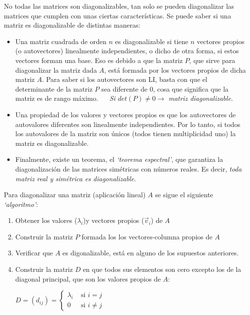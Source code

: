 No todas las matrices son diagonalizables, tan solo se pueden diagonalizar las matrices que cumplen con unas ciertas características. Se puede saber si una matriz es diagonalizable de distintas maneras:

\begin{itemize}

\item Una matriz cuadrada de orden $n$ es diagonalizable si tiene $n$ vectores propios (o autovectores) linealmente independientes, o dicho de otra forma, si estos vectores forman una base. Eso es debido a que la matriz $P$, que sirve para diagonalizar la matriz dada $A$, está formada por los vectores propios de dicha matriz $A$. Para saber si los autovectores son LI, basta con que el determinante de la matriz $P$ sea diferente de $0$, cosa que significa que la matriz es de rango máximo. $\quad$ \emph{Si $det(P)\neq 0 \to $ matriz diagonalizable.}
\item Una propiedad de los valores y vectores propios es que los autovectores de autovalores diferentes son linealmente independientes. Por lo tanto, si todos los autovalores de la matriz son únicos (todos tienen multiplicidad uno)  la matriz es diagonalizable.
\item Finalmente, existe un teorema, el \emph{`teorema espectral'}, que garantiza la diagonalización de las matrices simétricas con números reales. Es decir, \emph{toda matriz real y simétrica es diagonalizable}.
	
\end{itemize}

Para diagonalizar  una matriz (aplicación lineal) $A$ se sigue el siguiente \emph{`algoritmo'}:

\begin{enumerate}
\item Obtener los valores ($\lambda_i$)y vectores propios ($\vec v_i$) de $A$
\item Construir la matriz $P$ formada los los vectores-columna propios de $A$
\item Verificar que $A$ es digonalizable, está en alguno de los supuestos anteriores.
\item Construir la matriz $D$ en que todos sus elementos son cero excepto los de la diagonal principal, que son los valores propios de $A$:

$D=(d_{ij})=\begin{cases} \lambda_i & \text{ si } i=j \\
0 & \text{ si } i \neq j \end{cases}$	
\end{enumerate}

